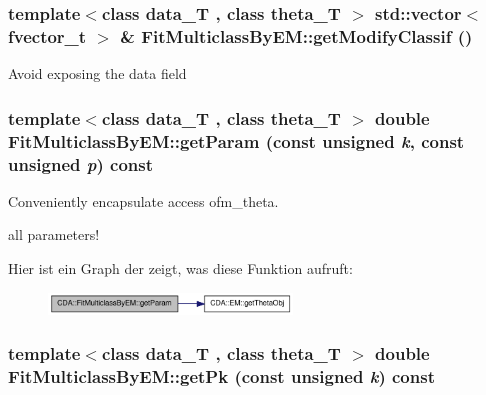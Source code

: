 \hypertarget{classCDA_1_1FitMulticlassByEM_a07c7f0fb577bb28b7987e80bb93d6707}{
\subsubsection[{getModifyClassif}]{\setlength{\rightskip}{0pt plus 5cm}template$<$class data\_\-T , class theta\_\-T $>$ std::vector$<$ fvector\_\-t $>$ \& FitMulticlassByEM::getModifyClassif ()}}
\label{classCDA_1_1FitMulticlassByEM_a07c7f0fb577bb28b7987e80bb93d6707}
Avoid exposing the data field \hypertarget{classCDA_1_1FitMulticlassByEM_a4185d0f323087ef9112e903a2782fdfd}{
\subsubsection[{getParam}]{\setlength{\rightskip}{0pt plus 5cm}template$<$class data\_\-T , class theta\_\-T $>$ double FitMulticlassByEM::getParam (const unsigned {\em k}, \/  const unsigned {\em p}) const}}
\label{classCDA_1_1FitMulticlassByEM_a4185d0f323087ef9112e903a2782fdfd}


Conveniently encapsulate access ofm\_\-theta. 

all parameters! 

Hier ist ein Graph der zeigt, was diese Funktion aufruft:\nopagebreak
\begin{figure}[H]
\begin{center}
\leavevmode
\includegraphics[width=184pt]{classCDA_1_1FitMulticlassByEM_a4185d0f323087ef9112e903a2782fdfd_cgraph}
\end{center}
\end{figure}


\hypertarget{classCDA_1_1FitMulticlassByEM_a869530b76ee4b40d38d3fb80ea0932aa}{
\subsubsection[{getPk}]{\setlength{\rightskip}{0pt plus 5cm}template$<$class data\_\-T , class theta\_\-T $>$ double FitMulticlassByEM::getPk (const unsigned {\em k}) const}}
\label{classCDA_1_1FitMulticlassByEM_a869530b76ee4b40d38d3fb80ea0932aa}


